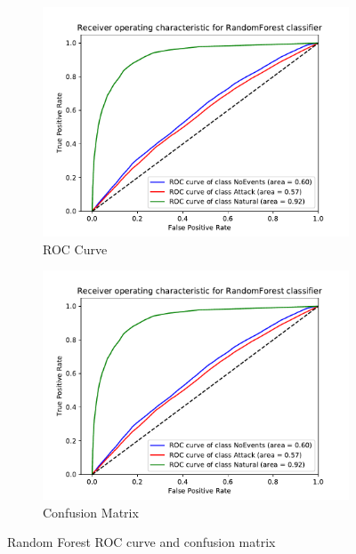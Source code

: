 \begin{figure}[H]
    \begin{subfigure}[t]{0.45\textwidth}
        \centering
        \includegraphics[page=1, width=\linewidth]{images/results_scikit/RandomForest}
        \caption{ROC Curve}
        \label{fig:scikit_RF_ROC}
    \end{subfigure}
    \begin{subfigure}[t]{0.45\textwidth}
        \centering
        \includegraphics[page=2, width=\linewidth, trim= 0 50 0 100, clip]{images/results_scikit/RandomForest}
        \caption{Confusion Matrix}
        \label{fig:scikit_RF_CM}
    \end{subfigure}
    \caption{Random Forest ROC curve and confusion matrix}
    \label{fig:ROCCM_RF}
\end{figure}

